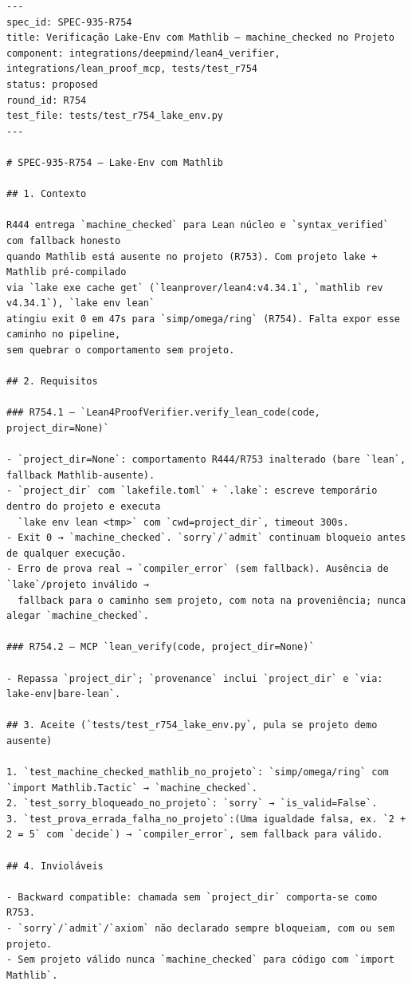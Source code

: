 \documentclass[12pt,openany,oneside,a4paper,brazil,chapter=TITLE]{abntex2}
\begin{document}
\begin{lstlisting}
---
spec_id: SPEC-935-R754
title: Verificação Lake-Env com Mathlib — machine_checked no Projeto
component: integrations/deepmind/lean4_verifier, integrations/lean_proof_mcp, tests/test_r754
status: proposed
round_id: R754
test_file: tests/test_r754_lake_env.py
---

# SPEC-935-R754 — Lake-Env com Mathlib

## 1. Contexto

R444 entrega `machine_checked` para Lean núcleo e `syntax_verified` com fallback honesto
quando Mathlib está ausente no projeto (R753). Com projeto lake + Mathlib pré-compilado
via `lake exe cache get` (`leanprover/lean4:v4.34.1`, `mathlib rev v4.34.1`), `lake env lean`
atingiu exit 0 em 47s para `simp/omega/ring` (R754). Falta expor esse caminho no pipeline,
sem quebrar o comportamento sem projeto.

## 2. Requisitos

### R754.1 — `Lean4ProofVerifier.verify_lean_code(code, project_dir=None)`

- `project_dir=None`: comportamento R444/R753 inalterado (bare `lean`, fallback Mathlib-ausente).
- `project_dir` com `lakefile.toml` + `.lake`: escreve temporário dentro do projeto e executa
  `lake env lean <tmp>` com `cwd=project_dir`, timeout 300s.
- Exit 0 → `machine_checked`. `sorry`/`admit` continuam bloqueio antes de qualquer execução.
- Erro de prova real → `compiler_error` (sem fallback). Ausência de `lake`/projeto inválido →
  fallback para o caminho sem projeto, com nota na proveniência; nunca alegar `machine_checked`.

### R754.2 — MCP `lean_verify(code, project_dir=None)`

- Repassa `project_dir`; `provenance` inclui `project_dir` e `via: lake-env|bare-lean`.

## 3. Aceite (`tests/test_r754_lake_env.py`, pula se projeto demo ausente)

1. `test_machine_checked_mathlib_no_projeto`: `simp/omega/ring` com `import Mathlib.Tactic` → `machine_checked`.
2. `test_sorry_bloqueado_no_projeto`: `sorry` → `is_valid=False`.
3. `test_prova_errada_falha_no_projeto`:(Uma igualdade falsa, ex. `2 + 2 = 5` com `decide`) → `compiler_error`, sem fallback para válido.

## 4. Invioláveis

- Backward compatible: chamada sem `project_dir` comporta-se como R753.
- `sorry`/`admit`/`axiom` não declarado sempre bloqueiam, com ou sem projeto.
- Sem projeto válido nunca `machine_checked` para código com `import Mathlib`.
\end{lstlisting}
\end{document}

